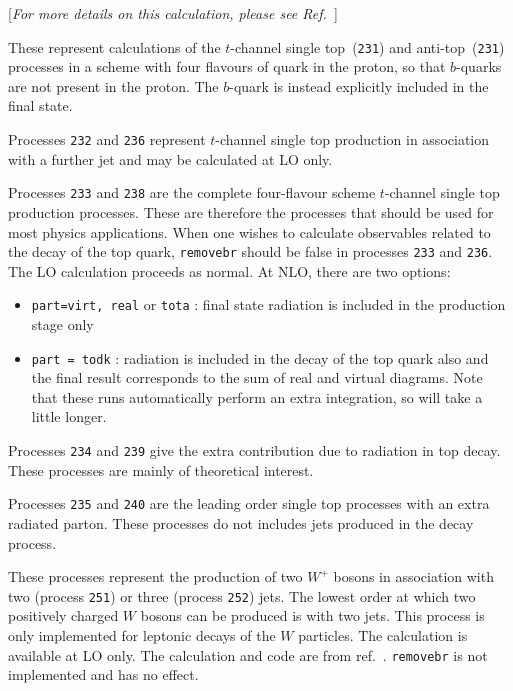 \label{subsec:stopb}

\begin{center}
[{\it For more details on this calculation, please see Ref.~\cite{Campbell:2009ss}}]
\end{center}

These represent calculations of the $t$-channel single top~({\tt 231}) and anti-top~({\tt 231})
processes in a scheme with four flavours of quark in the proton, so that $b$-quarks are not present in the proton.
The $b$-quark is instead explicitly included in the final state.

Processes {\tt 232} and {\tt 236} represent $t$-channel single top production in association
with a further jet and may be calculated at LO only.

Processes {\tt 233} and {\tt 238} are the complete four-flavour scheme $t$-channel single top production processes.
These are therefore the processes that should be used for most physics applications.
When one wishes to calculate observables related to the decay of the top
quark, {\tt removebr} should be false in processes {\tt 233} and {\tt 236}.
The LO calculation proceeds as normal. At NLO, there are two options:
\begin{itemize}
\item {\tt part=virt, real} or {\tt tota} : final state radiation is included
in the production stage only
\item {\tt part = todk} : radiation is included in the decay of the top
quark also and the final result corresponds to the sum of real and virtual
diagrams. 
Note that these runs automatically perform an extra integration, so
will take a little longer.
\end{itemize}


Processes {\tt 234} and {\tt 239} give the extra contribution due to radiation 
in top decay. These processes are mainly of theoretical interest. 

Processes {\tt 235} and {\tt 240} are the leading order single top processes with an 
extra radiated parton. These processes do not includes jets produced in the decay process.

These processes represent the production of two $W^+$ 
bosons in association with two (process {\tt 251}) or three (process {\tt 252})
jets.  The lowest order at which two positively charged $W$ bosons 
can be produced is with two jets. 
This process is only implemented for leptonic decays of the 
$W$ particles. The calculation is available at LO only.
The calculation and code are from ref.~\cite{Melia:2010bm}.
{\tt removebr} is not implemented and has no effect.

